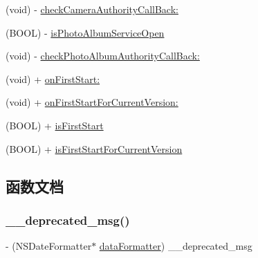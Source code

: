 \begin{DoxyCompactItemize}
\item 
(void) -\/ \hyperlink{interface_m_a_r_global_manager_abdf02615736a7460ba48835068e041ed}{check\+Camera\+Authority\+Call\+Back\+:}
\item 
(B\+O\+OL) -\/ \hyperlink{interface_m_a_r_global_manager_a0341328dd360a4b58e92c93ec3718502}{is\+Photo\+Album\+Service\+Open}
\item 
(void) -\/ \hyperlink{interface_m_a_r_global_manager_ab88ac80ac53098f87c7b00b3f4384fd2}{check\+Photo\+Album\+Authority\+Call\+Back\+:}
\item 
(void) + \hyperlink{interface_m_a_r_global_manager_a94914844e4bcead6ec3e96b71d6f3473}{on\+First\+Start\+:}
\item 
(void) + \hyperlink{interface_m_a_r_global_manager_a0fa3b3aaa9b424536891ca366c9fc2a9}{on\+First\+Start\+For\+Current\+Version\+:}
\item 
(B\+O\+OL) + \hyperlink{interface_m_a_r_global_manager_ab871ef83135ce7e7f412fdebfae76c0d}{is\+First\+Start}
\item 
(B\+O\+OL) + \hyperlink{interface_m_a_r_global_manager_ab111e5c33b73bd47237c0006b532655b}{is\+First\+Start\+For\+Current\+Version}
\end{DoxyCompactItemize}


\subsection{函数文档}
\mbox{\label{interface_m_a_r_global_manager_a1eeccccea3a359e7669dd51a8542786d}} 
\subsubsection{\texorpdfstring{\+\_\+\+\_\+deprecated\+\_\+msg()}{\_\_deprecated\_msg()}}
{\footnotesize\ttfamily -\/ (N\+S\+Date\+Formatter$\ast$ \hyperlink{interface_m_a_r_global_manager_a1c44749ed33c07086829c958d8bc1c6d}{data\+Formatter}) \+\_\+\+\_\+deprecated\+\_\+msg \begin{DoxyParamCaption}\item[{(\char`\"{}use `\hyperlink{interface_m_a_r_global_manager_adb282253173b29bd426f9f429666d7f0}{date\+Formatter}`\char`\"{})}]{ }\end{DoxyParamCaption}}

